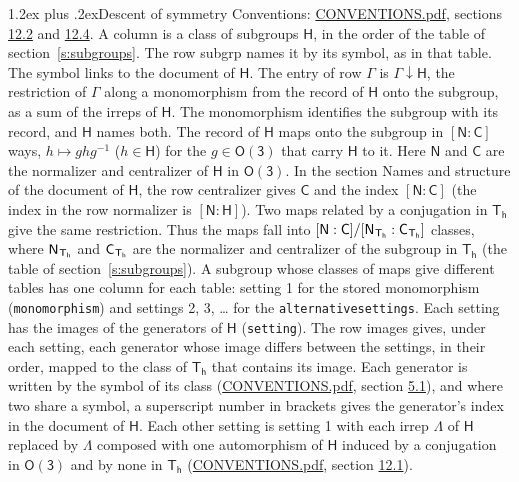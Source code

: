 \documentclass[10pt,a4paper]{article}
\makeatletter
\renewcommand\section{\@startsection{section}{1}{\z@}{-3ex plus -1ex minus -.2ex}%
  {1.2ex plus .2ex}{\normalfont\large\sffamily\bfseries\color{parttitle}}}
\numberwithin{equation}{section}
\newcommand{\grp}[1]{\mathsf{#1}}
\newcommand{\grpindex}[2]{[#1 : #2]}
\newcommand{\restr}[2]{#1\!\downarrow#2}
\newcommand{\hairsp}{\mkern1mu}
\makeatother
\begin{document}
\section{Descent of symmetry}\label{s:subduction}
Conventions: \href{../../CONVENTIONS.pdf}{CONVENTIONS.pdf}, sections \href{../../CONVENTIONS.pdf\#conv.12.2}{12.2} and \href{../../CONVENTIONS.pdf\#conv.12.4}{12.4}.
A column is a class of subgroups $\grp{H}$, in the order of the table of section~\ref{s:subgroups}. The row subgrp names it by its symbol, as in that table. The symbol links to the document of $\grp{H}$. The entry of row $\Gamma$ is $\restr{\Gamma}{\grp{H}}$, the restriction of $\Gamma$ along a monomorphism from the record of $\grp{H}$ onto the subgroup, as a sum of the irreps of $\grp{H}$. The monomorphism identifies the subgroup with its record, and $\grp{H}$ names both. \label{n:group.normalizer.o3}\label{n:group.centralizer.o3}The record of $\grp{H}$ maps onto the subgroup in $\grpindex{\grp{N}}{\grp{C}}$ ways, $h \mapsto g h g^{-1}$ ($h \in \grp{H}$) for the $g \in \grp{O(3)}$ that carry $\grp{H}$ to it. Here $\grp{N}$ and $\grp{C}$ are the normalizer and centralizer of $\grp{H}$ in \href{O3.pdf}{$\grp{O(3)}$}. In the section Names and structure of the document of $\grp{H}$, the row centralizer gives $\grp{C}$ and the index $\grpindex{\grp{N}}{\grp{C}}$ (the index in the row normalizer is $\grpindex{\grp{N}}{\grp{H}}$). Two maps related by a conjugation in $\grp{T_{h}}$ give the same restriction. Thus the maps fall into $\grpindex{\grp{N}}{\grp{C}}/\grpindex{\grp{N}_{\hairsp \grp{T_{h}}}}{\grp{C}_{\hairsp \grp{T_{h}}}}$ classes, where $\grp{N}_{\hairsp \grp{T_{h}}}$ and $\grp{C}_{\hairsp \grp{T_{h}}}$ are the normalizer and centralizer of the subgroup in $\grp{T_{h}}$ (the table of section~\ref{s:subgroups}). \label{n:head.setting}A subgroup whose classes of maps give different tables has one column for each table: setting 1 for the stored monomorphism (\texttt{monomorphism}) and settings 2, 3, \dots{} for the \texttt{alternativesettings}. Each setting has the images of the generators of $\grp{H}$ (\texttt{setting}). \label{n:head.images}The row images gives, under each setting, each generator whose image differs between the settings, in their order, mapped to the class of $\grp{T_{h}}$ that contains its image. \label{n:element.generator.index}Each generator is written by the symbol of its class (\href{../../CONVENTIONS.pdf}{CONVENTIONS.pdf}, section \href{../../CONVENTIONS.pdf\#conv.5.1}{5.1}), and where two share a symbol, a superscript number in brackets gives the generator's index in the document of $\grp{H}$. \label{n:irrep.Delta}Each other setting is setting 1 with each irrep $\Lambda$ of $\grp{H}$ replaced by $\Lambda$ composed with one automorphism of $\grp{H}$ induced by a conjugation in \href{O3.pdf}{$\grp{O(3)}$} and by none in $\grp{T_{h}}$ (\href{../../CONVENTIONS.pdf}{CONVENTIONS.pdf}, section \href{../../CONVENTIONS.pdf\#conv.12.1}{12.1}).
\end{document}
